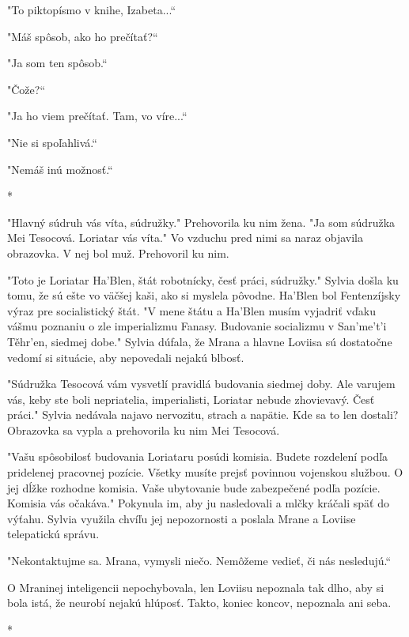 \documentclass{book}
\begin{document}
"$ $To piktopísmo v knihe, Izabeta...“

"$ $Máš spôsob, ako ho prečítať?“

"$ $Ja som ten spôsob.“

"$ $Čože?“

"$ $Ja ho viem prečítať. Tam, vo víre...“

"$ $Nie si spoľahlivá.“

"$ $Nemáš inú možnosť.“

\begin{center}

*

\end{center}

"$ $Hlavný súdruh vás víta, súdružky."$ $ Prehovorila ku nim žena. "$ $Ja som súdružka Mei Tesocová. Loriatar vás víta."$ $ Vo vzduchu pred nimi sa naraz objavila obrazovka. V nej bol muž. Prehovoril ku nim.

"$ $Toto je Loriatar Ha'Blen, štát robotnícky, česť práci, súdružky."$ $ Sylvia došla ku tomu, že sú ešte vo väčšej kaši, ako si myslela pôvodne. Ha'Blen bol Fentenzíjsky výraz pre socialistický štát. "$ $V mene štátu a Ha'Blen musím vyjadriť vďaku vášmu poznaniu o zle imperializmu Fanasy. Budovanie socializmu v San'me't'i Te\v{}hr'en, siedmej dobe."$ $ Sylvia dúfala, že Mrana a hlavne Loviisa sú dostatočne vedomí si situácie, aby nepovedali nejakú blbosť.

"$ $Súdružka Tesocová vám vysvetlí pravidlá budovania siedmej doby. Ale varujem vás, keby ste boli nepriatelia, imperialisti, Loriatar nebude zhovievavý. Česť práci."$ $ Sylvia nedávala najavo nervozitu, strach a napätie. Kde sa to len dostali? Obrazovka sa vypla a prehovorila ku nim Mei Tesocová.

"$ $Vašu spôsobilosť budovania Loriataru posúdi komisia. Budete rozdelení podľa pridelenej pracovnej pozície. Všetky musíte prejsť povinnou vojenskou službou. O jej dĺžke rozhodne komisia. Vaše ubytovanie bude zabezpečené podľa pozície. Komisia vás očakáva."$ $ Pokynula im, aby ju nasledovali a mlčky kráčali späť do výťahu. Sylvia využila chvíľu jej nepozornosti a poslala Mrane a Loviise telepatickú správu.

"$ $Nekontaktujme sa. Mrana, vymysli niečo. Nemôžeme vedieť, či nás nesledujú.“

O Mraninej inteligencii nepochybovala, len Loviisu nepoznala tak dlho, aby si bola istá, že neurobí nejakú hlúposť. Takto, koniec koncov, nepoznala ani seba.

\begin{center}

*

\end{center}
\end{document}
